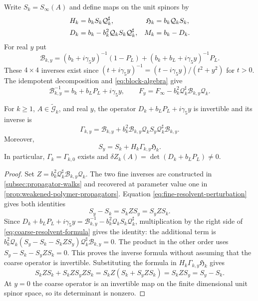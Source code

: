 Write $S_k=S_\infty(A)$ and define maps on the unit spinors by
\begin{align}
 H_k&=b_kS_k\mathcal Q_k^\sharp,&
 \mathfrak H_k&=b_k\mathcal Q_kS_k,\notag\\
 D_k&=b_k-b_k^2\mathcal Q_kS_k\mathcal Q_k^\sharp,&
 M_k&=b_k-D_k.\label{eq:coarse-dirac-definition}
\end{align}
For real $y$ put
\[
 \mathcal B_{k,y}=(b_k+i\gamma_5y)^{-1}(1-P_L)
                   +(b_k+b_L+i\gamma_5y)^{-1}P_L.
\]
These $4\times4$ inverses exist since
$(t+i\gamma_5y)^{-1}=(t-i\gamma_5y)/(t^2+y^2)$ for $t>0$.
The idempotent decomposition and \eqref{eq:block-algebra} give
\begin{equation}\label{eq:fine-resolvent-perturbation}
 \mathcal B_{k,y}^{-1}=b_k+b_LP_L+i\gamma_5y,\qquad
 F_y=F_\infty-b_k^2\mathcal Q_k^\sharp
                       \mathcal B_{k,y}\mathcal Q_k.
\end{equation}

\begin{proposition}\label{prop:fine-coarse-resolvents}
For $k\ge1$, $A\in\widetilde{\mathcal G}_k$, and real $y$, the
operator $D_k+b_LP_L+i\gamma_5y$ is invertible and its inverse is
\begin{equation}\label{eq:coarse-resolvent-formula}
 \Gamma_{k,y}=\mathcal B_{k,y}
       +b_k^2\mathcal B_{k,y}\mathcal Q_kS_y
                         \mathcal Q_k^\sharp\mathcal B_{k,y}.
\end{equation}
Moreover,
\begin{equation}\label{eq:resolved-fine-covariance}
 S_y=S_k+H_k\Gamma_{k,y}\mathfrak H_k.
\end{equation}
In particular, $\Gamma_k=\Gamma_{k,0}$ exists and
$\delta Z_k(A)=\det(D_k+b_LP_L)\ne0$.
\end{proposition}

\begin{proof}
Set $Z=b_k^2\mathcal Q_k^\sharp\mathcal B_{k,y}\mathcal Q_k$.
The two fine inverses are constructed in
\cref{subsec:propagator-walks} and recovered at parameter value
one in \cref{prop:weakened-polymer-propagators}. Equation
\eqref{eq:fine-resolvent-perturbation} gives both identities
\[
 S_y-S_k=S_kZS_y=S_yZS_k.
\]
Since $D_k+b_LP_L+i\gamma_5y
=\mathcal B_{k,y}^{-1}-b_k^2\mathcal Q_kS_k\mathcal Q_k^\sharp$,
multiplication by the right side of
\eqref{eq:coarse-resolvent-formula} gives the identity: the additional
term is
$b_k^2\mathcal Q_k(S_y-S_k-S_kZS_y)
\mathcal Q_k^\sharp\mathcal B_{k,y}=0$.
The product in the other order uses $S_y-S_k-S_yZS_k=0$.
This proves the inverse formula without assuming that the coarse
operator is invertible. Substituting the formula in
$H_k\Gamma_{k,y}\mathfrak H_k$ gives
\[
 S_kZS_k+S_kZS_yZS_k
     =S_kZ(S_k+S_yZS_k)=S_kZS_y=S_y-S_k.
\]
At $y=0$ the coarse operator is an invertible map on the finite
dimensional unit spinor space, so its determinant is nonzero.
\end{proof}

